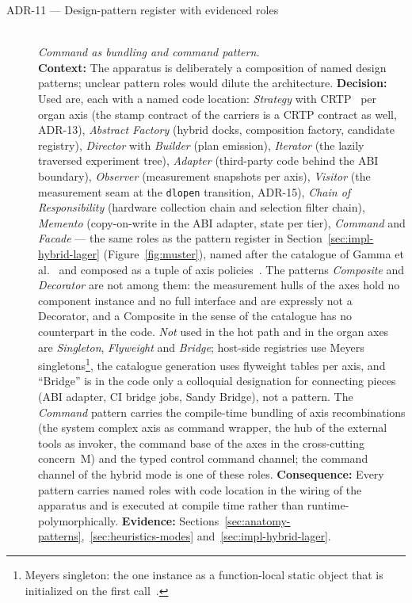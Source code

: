 \begin{description}
  \item[ADR-11 --- Design-pattern register with evidenced roles]\hfill\\
  \emph{Command as bundling and command pattern.}\hfill\\
  \textbf{Context:} The apparatus is deliberately a composition of named design patterns; unclear
  pattern roles would dilute the architecture.
  \textbf{Decision:} Used are, each with a named code location: \emph{Strategy} with
  CRTP~\cite{coplien1995crtp} per organ axis (the stamp contract of the carriers is a CRTP contract
  as well, ADR-13), \emph{Abstract Factory} (hybrid docks, composition factory, candidate registry),
  \emph{Director} with \emph{Builder} (plan emission), \emph{Iterator} (the lazily traversed
  experiment tree), \emph{Adapter} (third-party code behind the ABI boundary), \emph{Observer}
  (measurement snapshots per axis), \emph{Visitor} (the measurement seam at the \texttt{dlopen}
  transition, ADR-15), \emph{Chain of Responsibility} (hardware collection chain and selection
  filter chain), \emph{Memento} (copy-on-write in the ABI adapter, state per tier), \emph{Command}
  and \emph{Facade} --- the same roles as the pattern register in
  Section~\ref{sec:impl-hybrid-lager} (Figure~\ref{fig:muster}), named after the catalogue of
  Gamma et al.~\cite{gamma1994patterns} and composed as a tuple of axis
  policies~\cite{alexandrescu2001modern}. The patterns \emph{Composite} and \emph{Decorator} are not
  among them: the measurement hulls of the axes hold no component instance and no full interface
  and are expressly not a Decorator, and a Composite in the sense of the catalogue has no
  counterpart in the code.
  \emph{Not} used in the hot path and in the organ axes are
  \emph{Singleton}, \emph{Flyweight} and \emph{Bridge}; host-side registries use Meyers
  singletons\footnote{Meyers singleton: the one instance as a function-local static object that is
  initialized on the first call~\cite{meyers2005effective}.}, the catalogue generation uses
  flyweight tables per axis, and \enquote{Bridge} is in the code only a colloquial designation for
  connecting pieces (ABI adapter, CI bridge jobs, Sandy Bridge), not a pattern. The \emph{Command}
  pattern carries the compile-time bundling of axis recombinations (the system complex axis as
  command wrapper, the hub of the external tools as invoker, the command base of the axes in the
  cross-cutting concern~M) and the typed control command channel; the command channel of the hybrid
  mode is one of these roles.
  \textbf{Consequence:} Every pattern carries named roles with code location in the wiring of the
  apparatus and is executed at compile time rather than runtime-polymorphically.
  \textbf{Evidence:} Sections~\ref{sec:anatomy-patterns},~\ref{sec:heuristics-modes}
  and~\ref{sec:impl-hybrid-lager}.


\end{description}
